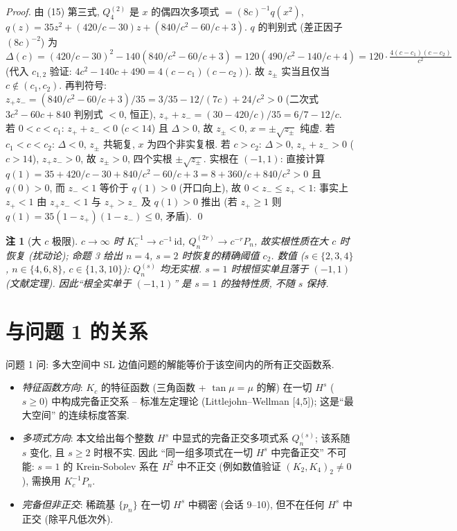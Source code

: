 \documentclass[UTF8]{ctexart}
\newtheorem{remark}[theorem]{注}
\begin{document}
\begin{proof}
	由 (15) 第三式, $Q_4^{(2)}$ 是 $x$ 的偶四次多项式 $= (8c)^{-1} q(x^2)$,
	$q(z) = 35z^2 + (420/c - 30)z + (840/c^2 - 60/c + 3)$.
	$q$ 的判别式 (差正因子 $(8c)^{-2}$) 为
	$\Delta(c) = (420/c - 30)^2 - 140(840/c^2 - 60/c + 3)
	= 120(490/c^2 - 140/c + 4) = 120 \cdot \frac{4(c-c_1)(c-c_2)}{c^2}$
	(代入 $c_{1,2}$ 验证: $4c^2 - 140c + 490 = 4(c-c_1)(c-c_2)$).
	故 $z_\pm$ 实当且仅当 $c \notin (c_1, c_2)$. 再判符号:
	$z_+ z_- = (840/c^2 - 60/c + 3)/35 = 3/35 - 12/(7c) + 24/c^2 > 0$
	(二次式 $3c^2 - 60c + 840$ 判别式 $< 0$, 恒正),
	$z_+ + z_- = (30 - 420/c)/35 = 6/7 - 12/c$.
	若 $0 < c < c_1$: $z_+ + z_- < 0$ ($c < 14$) 且 $\Delta > 0$, 故 $z_\pm < 0$,
	$x = \pm\sqrt{z_\pm}$ 纯虚. 若 $c_1 < c < c_2$: $\Delta < 0$, $z_\pm$ 共轭复,
	$x$ 为四个非实复根. 若 $c > c_2$: $\Delta > 0$, $z_+ + z_- > 0$
	($c > 14$), $z_+ z_- > 0$, 故 $z_\pm > 0$, 四个实根 $\pm\sqrt{z_\pm}$.
	实根在 $(-1,1)$: 直接计算 $q(1) = 35 + 420/c - 30 + 840/c^2 - 60/c + 3
	= 8 + 360/c + 840/c^2 > 0$ 且 $q(0) > 0$, 而 $z_- < 1$ 等价于 $q(1) > 0$
	(开口向上), 故 $0 < z_- \leq z_+ < 1$: 事实上 $z_+ < 1$ 由
	$z_+ z_- < 1$ 与 $z_+ > z_-$ 及 $q(1)>0$ 推出 (若 $z_+ \geq 1$ 则
	$q(1) = 35(1-z_+)(1-z_-) \leq 0$, 矛盾). \qed
\end{proof}

\begin{remark}[大 $c$ 极限]
	$c \to \infty$ 时 $K_c^{-1} \to c^{-1}\,\mathrm{id}$, $Q_n^{(2r)}
	\to c^{-r}P_n$, 故实根性质在大 $c$ 时恢复 (扰动论); 命题 3 给出
	$n=4$, $s=2$ 时恢复的精确阈值 $c_2$. 数值 ($s \in \{2,3,4\}$,
	$n \in \{4,6,8\}$, $c \in \{1,3,10\}$): $Q_n^{(s)}$ 均无实根.
	$s=1$ 时根恒实单且落于 $(-1,1)$ (文献定理). 因此``根全实单于
	$(-1,1)$'' 是 $s=1$ 的独特性质, 不随 $s$ 保持.
\end{remark}

\section{与问题 1 的关系}

问题 1 问: 多大空间中 SL 边值问题的解能等价于该空间内的所有正交函数系.
\begin{itemize}
	\item \emph{特征函数方向}: $K_c$ 的特征函数 (三角函数 + $\tan\mu=\mu$ 的解)
		在一切 $H^s$ ($s \geq 0$) 中构成完备正交系 -- 标准左定理论
		(Littlejohn--Wellman [4,5]); 这是``最大空间'' 的连续标度答案.
	\item \emph{多项式方向}: 本文给出每个整数 $H^s$ 中显式的完备正交多项式系
		$Q_n^{(s)}$; 该系随 $s$ 变化, 且 $s \geq 2$ 时根不实. 因此
		``同一组多项式在一切 $H^s$ 中完备正交'' 不可能: $s=1$ 的
		Krein-Sobolev 系在 $H^2$ 中不正交 (例如数值验证
		$(K_2, K_4)_2 \neq 0$), 需换用 $K_c^{-1}P_n$.
	\item \emph{完备但非正交}: 稀疏基 $\{p_n\}$ 在一切 $H^s$ 中稠密
		(会话 9--10), 但不在任何 $H^s$ 中正交 (除平凡低次外).
\end{itemize}
\end{document}
